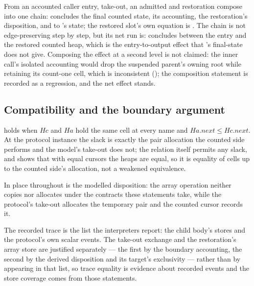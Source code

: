 \documentclass[a4paper,UKenglish,cleveref]{lipics-v2021}
\begin{document}
\begin{theorem}\label{thm:chain}
From an accounted caller entry, take-out, an admitted  and
restoration compose into one chain:  concludes the
final counted state, its accounting, the restoration's  disposition,
and  to 's state; the restored slot's own equation is
. The chain is not edge-preserving
step by step, but its net run is:  concludes
 between the entry and the restored counted heap, which is the
entry-to-output effect that 's final-state
 does not give. Composing the effect at a second level is not
claimed: the inner call's isolated accounting would drop the suspended parent's
owning root while retaining its count-one cell, which is inconsistent
(); the composition statement is recorded
as a regression, and the net effect stands.
\end{theorem}

\subsection{Compatibility and the boundary argument}
\begin{definition}\label{def:compat}
 holds when $Hc$ and $Ha$ hold the same cell at every name
and $Ha.\mathit{next} \le Hc.\mathit{next}$. At the protocol instance the slack is
exactly the pair allocation the counted side performs and the model's take-out does
not; the relation itself permits any slack, and
 shows that with equal cursors the heaps are
equal, so it is equality of cells up to the counted side's allocation, not a
weakened equivalence.
\end{definition}

In place throughout is the modelled disposition: the array operation neither
copies nor allocates under the contracts these statements take, while the
protocol's take-out allocates the temporary pair and the counted cursor records
it.

The recorded trace is the list the interpreters report: the child body's stores
and the protocol's own scalar events. The take-out exchange and the restoration's
array store are justified separately — the first by the boundary accounting, the
second by the derived disposition and its target's exclusivity — rather than by
appearing in that list, so trace equality is evidence about recorded events and the
store coverage comes from those statements.
\end{document}
